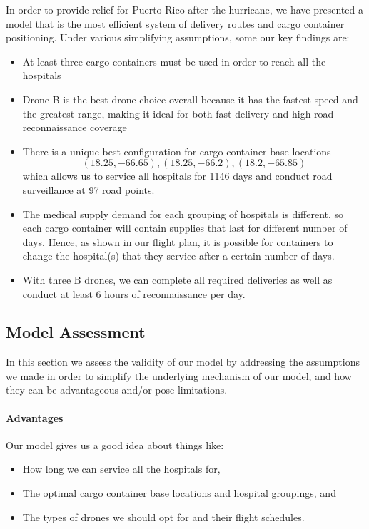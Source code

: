 In order to provide relief for Puerto Rico after the hurricane, we have presented a model that is the most efficient system of delivery routes and cargo container positioning. Under various simplifying assumptions, some our key findings are: 
\begin{itemize}
    \item At least three cargo containers must be used in order to reach all the hospitals
    \item Drone B is the best drone choice overall because it has the fastest speed and the greatest range, making it ideal for both fast delivery and high road reconnaissance coverage
    \item There is a unique best configuration for cargo container base locations
    $$(18.25,-66.65), (18.25, -66.2), (18.2, -65.85)$$
    which allows us to service all hospitals for 1146 days and conduct road surveillance at 97 road points. 
    \item The medical supply demand for each grouping of hospitals is different, so each cargo container will contain supplies that last for different number of days. Hence, as shown in our flight plan, it is possible for containers to change the hospital(s) that they service after a certain number of days. 
    \item With three B drones, we can complete all required deliveries as well as conduct at least 6 hours of reconnaissance per day.
\end{itemize}

\subsection{Model Assessment}
In this section we assess the validity of our model by addressing the assumptions we made in order to simplify the underlying mechanism of our model, and how they can be advantageous and/or pose limitations.

\paragraph{Advantages} Our model gives us a good idea about things like:
\begin{itemize}
    \item How long we can service all the hospitals for,
    \item The optimal cargo container base locations and hospital groupings, and 
    \item The types of drones we should opt for and their flight schedules.
\end{itemize}

